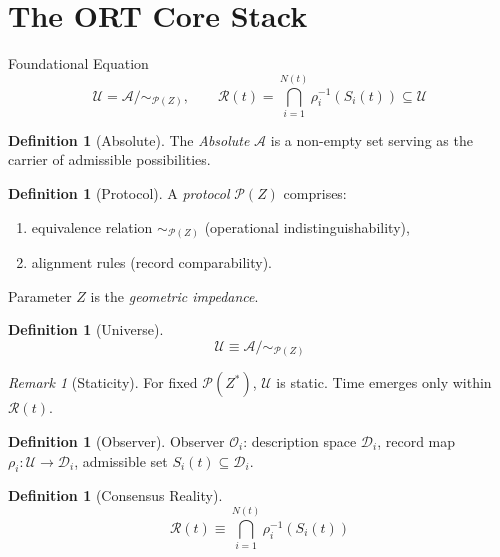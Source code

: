 \documentclass[12pt,a4paper]{article}
\numberwithin{equation}{section}
\theoremstyle{plain}
\theoremstyle{definition}
\newtheorem{definition}[theorem]{Definition}
\theoremstyle{remark}
\newtheorem{remark}[theorem]{Remark}
\newcommand{\Abs}{\ensuremath{\mathcal{A}}}
\newcommand{\Prot}{\ensuremath{\mathcal{P}}}
\newcommand{\Universe}{\ensuremath{\mathcal{U}}}
\newcommand{\Desc}{\ensuremath{\mathcal{D}}}
\newcommand{\Reality}{\ensuremath{\mathcal{R}}}
\newcommand{\Observer}{\ensuremath{\mathcal{O}}}
\newcommand{\Zed}{\ensuremath{Z}}
\begin{document}
\section{The ORT Core Stack}
\label{sec:stack}

\begin{corebox}{Foundational Equation}
\[
\boxed{
\Universe = \Abs/\!\sim_{\Prot(\Zed)},
\qquad
\Reality(t)=\bigcap_{i=1}^{N(t)}\rho_i^{-1}(S_i(t))
\subseteq \Universe
}
\]
\end{corebox}

\begin{definition}[Absolute]
\label{def:absolute}
The \emph{Absolute} $\Abs$ is a non-empty set serving as the carrier of admissible possibilities.
\end{definition}

\begin{definition}[Protocol]
\label{def:protocol}
A \emph{protocol} $\Prot(\Zed)$ comprises:
\begin{enumerate}[label=(\roman*),nosep]
\item equivalence relation $\sim_{\Prot(\Zed)}$ (operational indistinguishability),
\item alignment rules (record comparability).
\end{enumerate}
Parameter $\Zed$ is the \emph{geometric impedance}.
\end{definition}

\begin{definition}[Universe]
\label{def:universe}
\[
\boxed{\Universe \equiv \Abs / \!\sim_{\Prot(\Zed)}}
\]
\end{definition}

\begin{remark}[Staticity]
For fixed $\Prot(\Zed^*)$, $\Universe$ is static. Time emerges only within $\Reality(t)$.
\end{remark}

\begin{definition}[Observer]
\label{def:observer}
Observer $\Observer_i$: description space $\Desc_i$, record map $\rho_i : \Universe \to \Desc_i$, admissible set $S_i(t) \subseteq \Desc_i$.
\end{definition}

\begin{definition}[Consensus Reality]
\label{def:reality}
\[
\boxed{\Reality(t) \equiv \bigcap_{i=1}^{N(t)} \rho_i^{-1}(S_i(t))}
\]
\end{definition}
\end{document}
